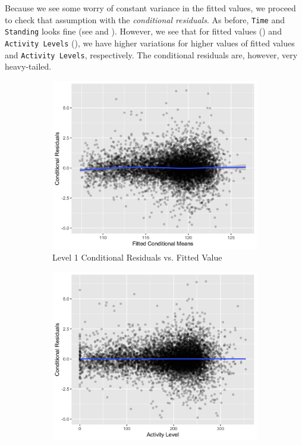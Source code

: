 \documentclass[12pt,twoside,letterpaper]{article}
\theoremstyle{definition}
\theoremstyle{definition}
\begin{document}
Because we see some worry of constant variance in the fitted values, we proceed to check that assumption with the \emph{conditional residuals}. As before, \texttt{Time} and \texttt{Standing} looks fine (see  and ). However, we see that for fitted values () and \texttt{Activity Levels} (), we have higher variations for higher values of fitted values and \texttt{Activity Levels}, respectively. The conditional residuals are, however, very heavy-tailed. 
\begin{figure}[H] 
    \centering
    \begin{subfigure}[b]{0.4\textwidth}
    \centering
    \includegraphics[width=\textwidth]{pics/cond resid fit.png}
    \caption[]%
    {{\small Level 1 Conditional Residuals vs. Fitted Value}}
    \label{fig: cond resid v fit}
    \end{subfigure}
    \hfill
    \begin{subfigure}[b]{0.4\textwidth}
    \centering
    \includegraphics[width=\textwidth]{pics/cond resid act.png}

\end{subfigure}
\end{figure}
\end{document}
